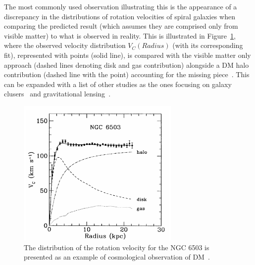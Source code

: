 \hspace{10pt} The most commonly used observation illustrating this is the appearance of a discrepancy in the distributions of rotation velocities of spiral galaxies when comparing the predicted result (which assumes they are comprised only from visible matter) to what is observed in reality. This is illustrated in Figure~\ref{fig:DM}, where the observed velocity distribution $V_C(Radius)$ (with its corresponding fit), represented with points (solid line), is compared with the visible matter only approach (dashed lines denoting disk and gas contribution) alongside a DM halo contribution (dashed line with the point) accounting for the missing piece~\cite{paper:dm_vc}. This can be expanded with a list of other studies as the ones focusing on galaxy clusers~\cite{paper:dm_gal_clust} and gravitational lensing~\cite{paper:dm_grav_lens}.

\begin{figure}[htbp]
    \begin{center}
        \includegraphics[width=0.7\textwidth]{Theory/DM_velocity.png}
        \caption{The distribution of the rotation velocity for the NGC 6503 is presented as an example of cosmological observation of DM~\cite{paper:dm_vc}.}
      \label{fig:DM} 
    \end{center}
  \end{figure}



